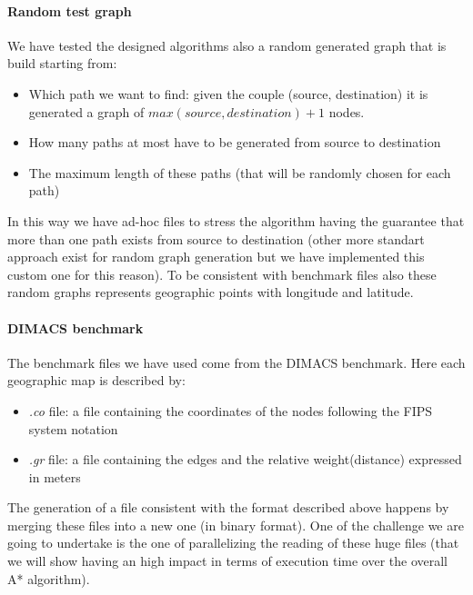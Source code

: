 \documentclass[twocolumn, switch]{article} %
\begin{document}
\paragraph{Random test graph} We have tested the designed algorithms also a random generated graph that
is build starting from: 
\begin{itemize}
  \item Which path we want to find: given the couple (source, destination) it is generated a graph of
        $max(source, destination) + 1$ nodes.
  \item How many paths at most have to be generated from source to destination
  \item The maximum length of these paths (that will be randomly chosen for each path)
\end{itemize}
In this way we have ad-hoc files to stress the algorithm having the guarantee that more than one path
exists from source to destination (other more standart approach exist for random graph generation but we
have implemented this custom one for this reason). To be consistent with benchmark files also these
random graphs represents geographic points with longitude and latitude.
\paragraph{DIMACS benchmark} 
The benchmark files we have used come from the DIMACS benchmark. Here each geographic map is described by:
\begin{itemize}
  \item \textit{.co} file: a file containing the coordinates of the nodes following the FIPS system notation
  \item \textit{.gr} file: a file containing the edges and the relative weight(distance) expressed in meters
\end{itemize}
The generation of a file consistent with the format described above happens by merging these files 
into a new one (in binary format). One of the challenge we are going to undertake is the one of
parallelizing the reading of these huge files (that we will show having an high impact in terms of
execution time over the overall A* algorithm).
\end{document}
